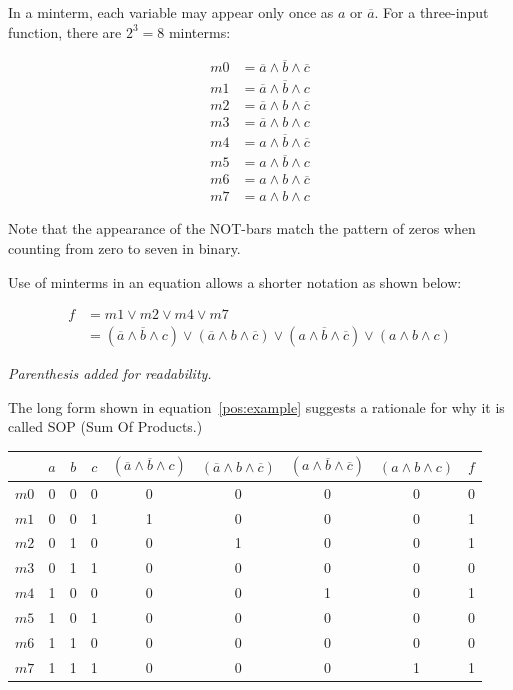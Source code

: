 \documentclass[10pt]{article}
\begin{document}
In a minterm, each variable may appear only once as $a$ or $\overline{a}$.
For a three-input function, there are $2^3 = 8$  minterms:

\begin{align}
m0 & = \overline{a} \land \overline{b} \land \overline{c} \\
m1 & = \overline{a} \land \overline{b} \land c \\
m2 & = \overline{a} \land b \land \overline{c} \\
m3 & = \overline{a} \land b \land c \\
m4 & = a \land \overline{b} \land \overline{c} \\
m5 & = a \land \overline{b} \land c \\
m6 & = a \land b \land \overline{c} \\
m7 & = a \land b \land c
\end{align}

Note that the appearance of the NOT-bars match the pattern of zeros when counting
from zero to seven in binary.

Use of minterms in an equation allows a shorter notation as shown below:

\begin{align}
f & = m1 \lor m2 \lor m4 \lor m7 \\
&= (\overline{a} \land \overline{b} \land c) \lor 
	(\overline{a} \land b \land \overline{c}) \lor 
	(a \land \overline{b} \land \overline{c}) \lor 
	(a \land b \land c) 	\label{pos:example}
\end{align}

{\em Parenthesis added for readability.}

The long form shown in equation~\ref{pos:example} suggests a rationale for why it is called SOP (Sum Of Products.)

\begin{center}
\begin{tabular}{|c|ccc|cccc|c|}
     & $a$ & $b$ & $c$ & 
		$(\overline{a} \land \overline{b} \land c)$ &
		$(\overline{a} \land b \land \overline{c})$ &
		$(a \land \overline{b} \land \overline{c})$ &
		$(a \land b \land c)$ &
		$f$ \\
\hline
$m0$ & 0 & 0 & 0 &  0 & 0 & 0 & 0 & 0\\
$m1$ & 0 & 0 & 1 &  1 & 0 & 0 & 0 & 1\\
$m2$ & 0 & 1 & 0 &  0 & 1 & 0 & 0 & 1\\
$m3$ & 0 & 1 & 1 &  0 & 0 & 0 & 0 & 0\\
$m4$ & 1 & 0 & 0 &  0 & 0 & 1 & 0 & 1\\
$m5$ & 1 & 0 & 1 &  0 & 0 & 0 & 0 & 0\\
$m6$ & 1 & 1 & 0 &  0 & 0 & 0 & 0 & 0\\
$m7$ & 1 & 1 & 1 &  0 & 0 & 0 & 1 & 1\\
\hline
\end{tabular}
\end{center}
\end{document}
